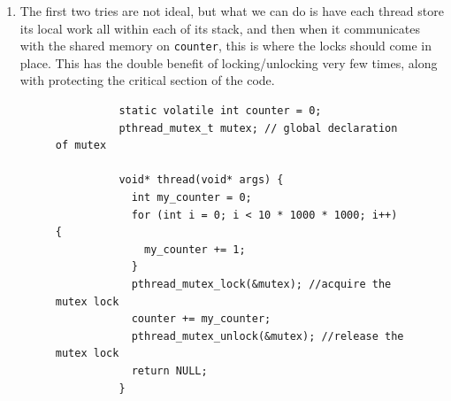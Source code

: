 \documentclass{article}
\begin{document}
\begin{enumerate}
\begin{figure}[H]
\begin{lstlisting}
          void* thread(void* args) {
            for (int i = 0; i < 10 * 1000 * 1000; i++) {
              pthread_mutex_lock(&mutex); //acquire the mutex lock
              counter += 1; 
              pthread_mutex_unlock(&mutex); //release the mutex lock
            }
            return NULL; 
          }

          int main(int argc, char *argv[]) {
            pthread_t thread1, thread2; 
            int rc; 
            rc = pthread_mutex_init(&mutex, NULL); //initialize the mutex
            rc = pthread_create(&thread1, NULL, thread, "A"); 
            rc = pthread_create(&thread2, NULL, thread, "B"); 
            rc = pthread_join(thread1, NULL); 
            rc = pthread_join(thread2, NULL); 
            pthread_mutex_destroy(&mutex); //destroy (free) the mutex
            printf("Counter : %d\n", counter); 
            return 0; 
          }
        \end{lstlisting}
        \caption{Now we put the locks within the counter. However, this is much slower since locking and unlocking are relatively expensive. It runs in 0.274s. } 
        \label{fig:second_try}
      \end{figure}

      \item The first two tries are not ideal, but what we can do is have each thread store its local work all within each of its stack, and then when it communicates with the shared memory on \texttt{counter}, this is where the locks should come in place. This has the double benefit of locking/unlocking very few times, along with protecting the critical section of the code. 

      \begin{figure}[H]
        \centering 
        \begin{lstlisting}
          static volatile int counter = 0; 
          pthread_mutex_t mutex; // global declaration of mutex

          void* thread(void* args) {
            int my_counter = 0; 
            for (int i = 0; i < 10 * 1000 * 1000; i++) {
              my_counter += 1; 
            }
            pthread_mutex_lock(&mutex); //acquire the mutex lock
            counter += my_counter; 
            pthread_mutex_unlock(&mutex); //release the mutex lock
            return NULL; 
          }


\end{lstlisting}
\end{figure}
\end{enumerate}
\end{document}
